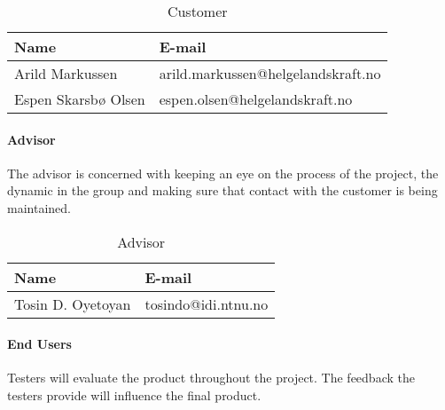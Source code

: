 \begin{table}

\begin{center}
    \begin{tabular}{| l | l |}
   	\hline
    {\bf Name} & {\bf E-mail} \\ \hline
    Arild Markussen & arild.markussen@helgelandskraft.no \\ \hline
    Espen Skarsbø Olsen & espen.olsen@helgelandskraft.no \\
    \hline
    \end{tabular}
\end{center}

\caption{Customer}
\end{table}

\paragraph{Advisor}

The advisor is concerned with keeping an eye on the process of the project, the dynamic in the group and making sure that contact with the customer is being maintained. 

\begin{table}

\begin{center}
    \begin{tabular}{| l | l |}
    \hline
    {\bf Name} & {\bf E-mail} \\ \hline
    Tosin D. Oyetoyan & tosindo@idi.ntnu.no \\ \hline
    \hline
    \end{tabular}
\end{center}

\caption{Advisor}
\end{table}

\paragraph{End Users}

Testers will evaluate the product throughout the project. The feedback the testers provide will influence the final product.